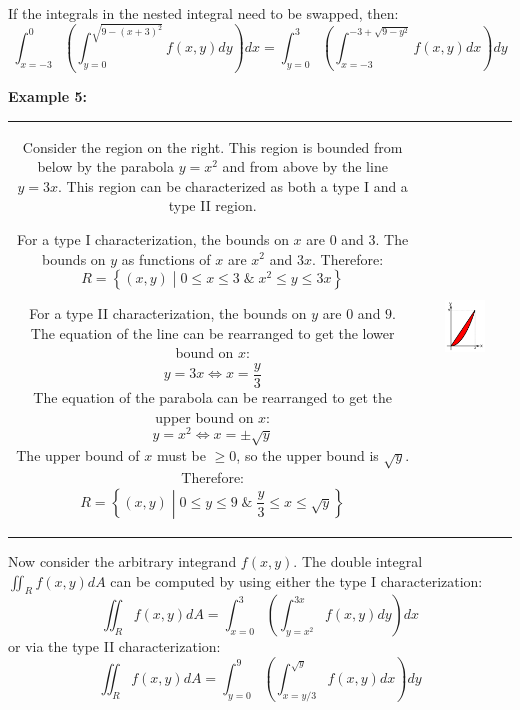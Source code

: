 \documentclass{article}
\begin{document}
If the integrals in the nested integral need to be swapped, then:
\[\int_{x = -3}^0 \left(\int_{y = 0}^{\sqrt{9 - (x + 3)^2}} f(x,y)dy\right)dx = \int_{y = 0}^3 \left(\int_{x = -3}^{-3 + \sqrt{9 - y^2}} f(x,y)dx\right)dy\]



\pagebreak

\textbf{Example 5:}

\vspace{5mm}

\begin{tabular}{cc}
\parbox{0.5\textwidth}{
Consider the region on the right. This region is bounded from below by the parabola \(y = x^2\) and from above by the line \(y = 3x\). This region can be characterized as both a type I and a type II region.    

For a type I characterization, the bounds on \(x\) are \(0\) and \(3\). The bounds on \(y\) as functions of \(x\) are \(x^2\) and \(3x\). Therefore:
\[R = \left\{(x,y) \middle| 0 \leq x \leq 3 \;\&\; x^2 \leq y \leq 3x\right\}\]

For a type II characterization, the bounds on \(y\) are \(0\) and \(9\). The equation of the line can be rearranged to get the lower bound on \(x\): 
\[y = 3x \iff x = \frac{y}{3}\]
The equation of the parabola can be rearranged to get the upper bound on \(x\):
\[y = x^2 \iff x = \pm \sqrt{y}\]
The upper bound of \(x\) must be \(\geq 0\), so the upper bound is \(\sqrt{y}\). Therefore:
\[R = \left\{(x,y) \middle| 0 \leq y \leq 9 \;\&\; \frac{y}{3} \leq x \leq \sqrt{y}\right\}\]

} & \parbox{0.5\textwidth}{
\includegraphics[width = 0.5\textwidth]{Example_5}
}
\end{tabular}
Now consider the arbitrary integrand \(f(x,y)\). The double integral \(\iint_R f(x,y)dA\) can be computed by using either the type I characterization: 
\[\iint_R f(x,y)dA = \int_{x = 0}^3 \left(\int_{y = x^2}^{3x} f(x,y)dy\right)dx\] 
or via the type II characterization: 
\[\iint_R f(x,y)dA = \int_{y = 0}^9 \left(\int_{x = y/3}^{\sqrt{y}} f(x,y)dx\right)dy\]
\end{document}
